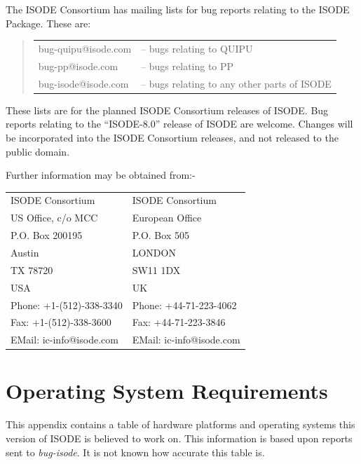 The ISODE Consortium has mailing lists for bug reports relating to the
ISODE Package.   These are:

\begin{quote}\begin{tabular}{ll}
bug-quipu@isode.com &  -- bugs relating to QUIPU\\
bug-pp@isode.com    &  -- bugs relating to PP\\
bug-isode@isode.com &  -- bugs relating to any other parts of ISODE\\
\end{tabular}\end{quote}

These lists are for the planned ISODE Consortium releases of ISODE.  
Bug reports relating to the ``ISODE-8.0'' release of ISODE are
welcome.   Changes will be incorporated into the ISODE Consortium
releases, and not released to the public domain.  

Further information may be obtained from:-

\begin{tabular}{ll}
ISODE Consortium &               ISODE Consortium\\
US Office, c/o MCC &             European Office\\
P.O. Box 200195    &             P.O. Box 505\\
Austin             &             LONDON\\
TX 78720           &             SW11 1DX\\
USA                &           	 UK\\
Phone: +1-(512)-338-3340       & Phone: +44-71-223-4062\\
Fax:   +1-(512)-338-3600       & Fax:   +44-71-223-3846\\
EMail:  ic-info@isode.com      & EMail:  ic-info@isode.com\\
\end{tabular}

\chapter{Operating System Requirements}
\label{ports}

This appendix contains a table of hardware platforms and
operating systems this version of ISODE is believed to work on.  This
information is based upon reports sent to {\em bug-isode}.  
It is not known how accurate this table is.





